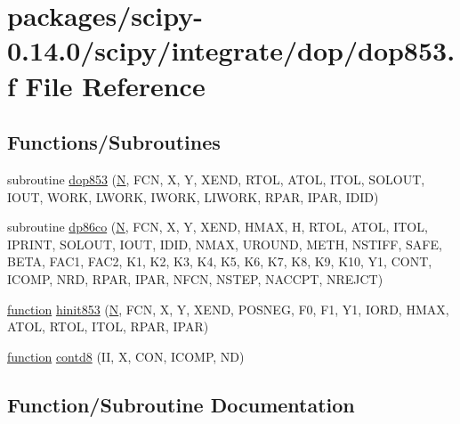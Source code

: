 \hypertarget{dop853_8f}{}\section{packages/scipy-\/0.14.0/scipy/integrate/dop/dop853.f File Reference}
\label{dop853_8f}
\subsection*{Functions/\+Subroutines}
\begin{DoxyCompactItemize}
\item 
subroutine \hyperlink{dop853_8f_ae1effdf32ed7f23ee4de2a43cf6f7669}{dop853} (\hyperlink{polmisc_8c_a0240ac851181b84ac374872dc5434ee4}{N}, F\+C\+N, X, Y, X\+E\+N\+D, R\+T\+O\+L, A\+T\+O\+L, I\+T\+O\+L, S\+O\+L\+O\+U\+T, I\+O\+U\+T, W\+O\+R\+K, L\+W\+O\+R\+K, I\+W\+O\+R\+K, L\+I\+W\+O\+R\+K, R\+P\+A\+R, I\+P\+A\+R, I\+D\+I\+D)
\item 
subroutine \hyperlink{dop853_8f_a290237b1c95ca7241e898ef681a40f97}{dp86co} (\hyperlink{polmisc_8c_a0240ac851181b84ac374872dc5434ee4}{N}, F\+C\+N, X, Y, X\+E\+N\+D, H\+M\+A\+X, H, R\+T\+O\+L, A\+T\+O\+L, I\+T\+O\+L, I\+P\+R\+I\+N\+T, S\+O\+L\+O\+U\+T, I\+O\+U\+T, I\+D\+I\+D, N\+M\+A\+X, U\+R\+O\+U\+N\+D, M\+E\+T\+H, N\+S\+T\+I\+F\+F, S\+A\+F\+E, B\+E\+T\+A, F\+A\+C1, F\+A\+C2, K1, K2, K3, K4, K5, K6, K7, K8, K9, K10, Y1, C\+O\+N\+T, I\+C\+O\+M\+P, N\+R\+D, R\+P\+A\+R, I\+P\+A\+R, N\+F\+C\+N, N\+S\+T\+E\+P, N\+A\+C\+C\+P\+T, N\+R\+E\+J\+C\+T)
\item 
\hyperlink{afunc_8m_a7b5e596df91eadea6c537c0825e894a7}{function} \hyperlink{dop853_8f_a24104e7e39ac4849811d07039030bb1a}{hinit853} (\hyperlink{polmisc_8c_a0240ac851181b84ac374872dc5434ee4}{N}, F\+C\+N, X, Y, X\+E\+N\+D, P\+O\+S\+N\+E\+G, F0, F1, Y1, I\+O\+R\+D, H\+M\+A\+X, A\+T\+O\+L, R\+T\+O\+L, I\+T\+O\+L, R\+P\+A\+R, I\+P\+A\+R)
\item 
\hyperlink{afunc_8m_a7b5e596df91eadea6c537c0825e894a7}{function} \hyperlink{dop853_8f_a49fabbd701b0e412f92d90218a82bced}{contd8} (I\+I, X, C\+O\+N, I\+C\+O\+M\+P, N\+D)
\end{DoxyCompactItemize}


\subsection{Function/\+Subroutine Documentation}
\hypertarget{dop853_8f_a49fabbd701b0e412f92d90218a82bced}{}
